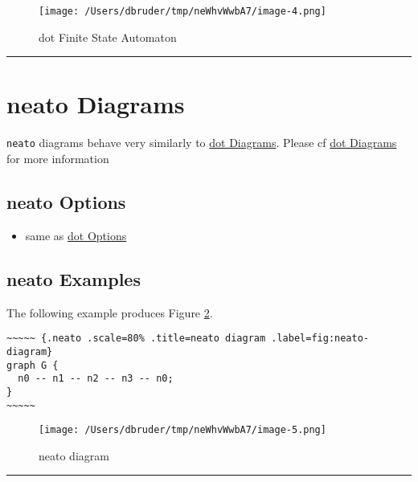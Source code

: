 \documentclass[]{article}
\begin{document}
\normalsize

\begin{figure}[htbp]
\centering
\texttt{[image: /Users/dbruder/tmp/neWhvWwbA7/image-4.png]}
\caption{dot Finite State Automaton\label{fig:dot-fsa}}
\end{figure}

\begin{center}\rule{3in}{0.4pt}\end{center}

\newpage

\section{neato Diagrams}\label{neato-diagrams}

\texttt{neato} diagrams behave very similarly to
\hyperref[dot-diagrams]{dot Diagrams}. Please cf
\hyperref[dot-diagrams]{dot Diagrams} for more information

\subsection{neato Options}\label{neato-options}

\begin{itemize}
\itemsep1pt\parskip0pt
\item
  same as \hyperref[dot-options]{dot Options}
\end{itemize}

\subsection{neato Examples}\label{neato-examples}

The following example produces Figure \ref{fig:neato-diagram}.

\scriptsize

\begin{verbatim}
~~~~~ {.neato .scale=80% .title=neato diagram .label=fig:neato-diagram}
graph G {
  n0 -- n1 -- n2 -- n3 -- n0;
}
~~~~~
\end{verbatim}

\normalsize

\begin{figure}[htbp]
\centering
\texttt{[image: /Users/dbruder/tmp/neWhvWwbA7/image-5.png]}
\caption{neato diagram\label{fig:neato-diagram}}
\end{figure}

\begin{center}\rule{3in}{0.4pt}\end{center}
\end{document}
